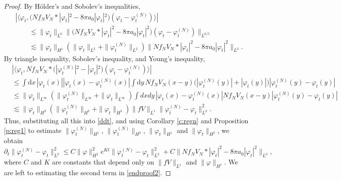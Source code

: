 \documentclass[11pt,a4paper,draft,DIV11]{scrartcl}	%
\newcommand{\di}{\textrm{d}}		%
\begin{document}
\begin{proof}
  By H\"older's and Sobolev's inequalities,
  \begin{align*}
    & |\langle \varphi_t, \big(N f_N V_N * |\varphi_t|^2 - 8 \pi a_0
    |\varphi_t|^2\big) (\varphi_t - \varphi_t^{(N)}) \rangle| \\
    & \qquad \le \| \varphi_t \|_{L^6} \| \big(N f_N V_N * |\varphi_t|^2 - 8 \pi
    a_0 |\varphi_t|^2\big) (\varphi_t - \varphi_t^{(N)}) \|_{L^{6/5}} \\
    & \qquad \apprle \| \varphi_t \|_{H^1} (\| \varphi_t \|_{L^2} + \|
    \varphi_t^{(N)} \|_{L^2}) \| N f_N V_N * |\varphi_t|^2 - 8 \pi a_0
    |\varphi_t|^2 \|_{L^3}.
  \end{align*}
  By triangle inequality, Sobolev's inequality, and Young's inequality,
  \begin{align*}
    & |\langle \varphi_t, N f_N V_N * \big(|\varphi_t^{(N)}|^2 - |\varphi_t|^2\big)
    (\varphi_t - \varphi_t^{(N)}) \rangle| \\
    & \le \int \di x\, |\varphi_t(x)| |\varphi_t(x) - \varphi_t^{(N)}(x)| \int \di y\, N
    f_N V_N(x-y) \big(|\varphi_t^{(N)}(y)| + |\varphi_t(y)|\big) |\varphi_t^{(N)}(y) -
    \varphi_t(y)| \\
    & \le \| \varphi_t \|_{L^\infty} ( \| \varphi_t^{(N)} \|_{L^\infty} + \|
    \varphi_t \|_{L^\infty} ) \int dx dy \, |\varphi_t(x) -
    \varphi_t^{(N)}(x)| N f_N V_N(x-y) |\varphi_t^{(N)}(y) - \varphi_t(y)| \\
    & \apprle \| \varphi_t \|_{H^2} ( \| \varphi_t^{(N)} \|_{H^2} + \|
    \varphi_t \|_{H^2} ) \| fV \|_{L^1} \| \varphi_t^{(N)} - \varphi_t
    \|_{L^2}^2.
  \end{align*}
  Thus, substituting all this into \eqref{ddt}, and using Corollary
  \ref{c:regn} and Proposition \ref{p:reg1} to estimate $\| \varphi_t^{(N)} \|_{H^1}$, $\|
  \varphi_t^{(N)} \|_{H^2}$, $\| \varphi_t \|_{H^1}$ and $\| \varphi_t
  \|_{H^2}$, we obtain
  \begin{equation} \label{endproof2}
    \partial_t \| \varphi_t^{(N)} - \varphi_t \|_{L^2}^2 \le C \| \varphi
    \|_{H^2}^2 e^{Kt} \| \varphi_t^{(N)} - \varphi_t \|_{L^2}^2 + C \| N f_N
    V_N * |\varphi_t|^2 - 8 \pi a_0 |\varphi_t|^2 \|_{L^3},
  \end{equation}
  where $C$ and $K$ are constants that depend only on $\| fV \|_{L^1}$ and $\|
  \varphi \|_{H^1}$. We are left to estimating the second term in
  \eqref{endproof2}.



\end{proof}
\end{document}
